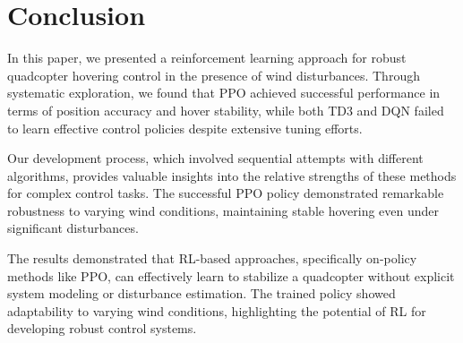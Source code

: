 \documentclass[12pt]{article}
\begin{document}
%     
%     
%     
%     

\section{Conclusion}

In this paper, we presented a reinforcement learning approach for robust quadcopter hovering control in the presence of wind disturbances. Through systematic exploration, we found that PPO achieved successful performance in terms of position accuracy and hover stability, while both TD3 and DQN failed to learn effective control policies despite extensive tuning efforts.


Our development process, which involved sequential attempts with different algorithms, provides valuable insights into the relative strengths of these methods for complex control tasks. The successful PPO policy demonstrated remarkable robustness to varying wind conditions, maintaining stable hovering even under significant disturbances.


The results demonstrated that RL-based approaches, specifically on-policy methods like PPO, can effectively learn to stabilize a quadcopter without explicit system modeling or disturbance estimation. The trained policy showed adaptability to varying wind conditions, highlighting the potential of RL for developing robust control systems.
\end{document}

